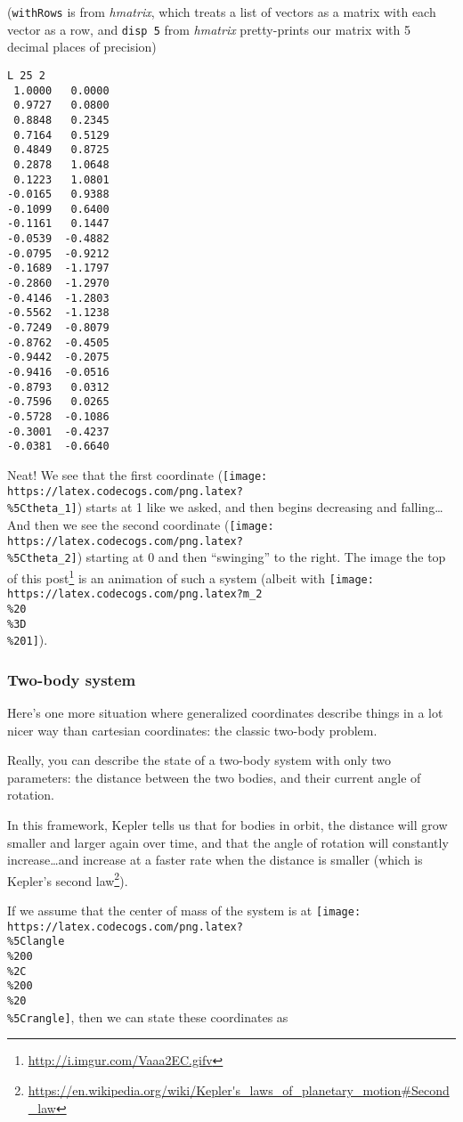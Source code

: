 \documentclass[]{article}
\renewcommand{\href}[2]{#2\footnote{\url{#1}}}
\begin{document}
(\texttt{withRows} is from \emph{hmatrix}, which treats a list of vectors as a
matrix with each vector as a row, and \texttt{disp\ 5} from \emph{hmatrix}
pretty-prints our matrix with 5 decimal places of precision)

\begin{verbatim}
L 25 2
 1.0000   0.0000
 0.9727   0.0800
 0.8848   0.2345
 0.7164   0.5129
 0.4849   0.8725
 0.2878   1.0648
 0.1223   1.0801
-0.0165   0.9388
-0.1099   0.6400
-0.1161   0.1447
-0.0539  -0.4882
-0.0795  -0.9212
-0.1689  -1.1797
-0.2860  -1.2970
-0.4146  -1.2803
-0.5562  -1.1238
-0.7249  -0.8079
-0.8762  -0.4505
-0.9442  -0.2075
-0.9416  -0.0516
-0.8793   0.0312
-0.7596   0.0265
-0.5728  -0.1086
-0.3001  -0.4237
-0.0381  -0.6640
\end{verbatim}

Neat! We see that the first coordinate
(\texttt{[image: https://latex.codecogs.com/png.latex?\\\%5Ctheta\_1]}) starts at 1
like we asked, and then begins decreasing and falling\ldots{} And then we see
the second coordinate
(\texttt{[image: https://latex.codecogs.com/png.latex?\\\%5Ctheta\_2]}) starting at
0 and then ``swinging'' to the right. The
\href{http://i.imgur.com/Vaaa2EC.gifv}{image the top of this post} is an
animation of such a system (albeit with
\texttt{[image: https://latex.codecogs.com/png.latex?m\_2\\\%20\\\%3D\\\%201]}).

\subsubsection{Two-body system}\label{two-body-system}

Here's one more situation where generalized coordinates describe things in a lot
nicer way than cartesian coordinates: the classic two-body problem.

Really, you can describe the state of a two-body system with only two
parameters: the distance between the two bodies, and their current angle of
rotation.

In this framework, Kepler tells us that for bodies in orbit, the distance will
grow smaller and larger again over time, and that the angle of rotation will
constantly increase\ldots{}and increase at a faster rate when the distance is
smaller (which is
\href{https://en.wikipedia.org/wiki/Kepler's_laws_of_planetary_motion\#Second_law}{Kepler's
second law}).

If we assume that the center of mass of the system is at
\texttt{[image: https://latex.codecogs.com/png.latex?\\\%5Clangle\\\%200\\\%2C\\\%200\\\%20\\\%5Crangle]},
then we can state these coordinates as
\end{document}

